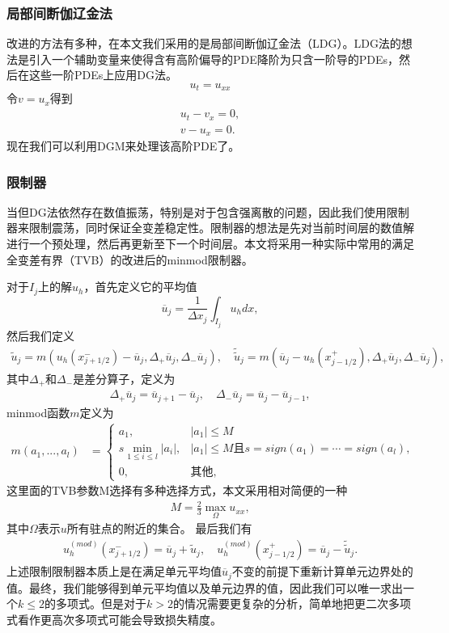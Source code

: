\subsubsection{局部间断伽辽金法}
改进的方法有多种，在本文我们采用的是局部间断伽辽金法（LDG）。LDG法的想法是引入一个辅助变量来使得含有高阶偏导的PDE降阶为只含一阶导的PDEs，然后在这些一阶PDEs上应用DG法。
\begin{equation}
    u_t = u_{xx}
\end{equation}
令$v = u_x$得到
\begin{align}
    u_t - v_x = 0, \\
    v - u_x = 0.
\end{align}
现在我们可以利用DGM来处理该高阶PDE了。
\subsubsection{限制器}
当但DG法依然存在数值振荡，特别是对于包含强离散的问题，因此我们使用限制器来限制震荡，同时保证全变差稳定性。限制器的想法是先对当前时间层的数值解进行一个预处理，然后再更新至下一个时间层。本文将采用一种实际中常用的满足全变差有界（TVB）的改进后的minmod限制器\cite{cockburn1989tvb2}。

对于$I_j$上的解$u_h$，首先定义它的平均值
$$
    \overline{u}_j = \frac{1}{\Delta x_j}\int_{I_j}u_h dx,
$$
然后我们定义
\begin{align}
    \tilde{u}_j = m(u_h(x^-_{j+1/2})-\overline{u}_j, \Delta_+\overline{u}_j, \Delta_-\overline{u}_j), \quad \tilde{\tilde{u}}_j = m(\overline{u}_j-u_h(x^+_{j-1/2}), \Delta_+\overline{u}_j, \Delta_-\overline{u}_j),
\end{align}
其中$\Delta_+$和$\Delta_-$是差分算子，定义为
\begin{align}
    \Delta_+\overline{u}_j = \overline{u}_{j+1}-\overline{u}_{j}, \quad \Delta_-\overline{u}_j = \overline{u}_{j}-\overline{u}_{j-1},
\end{align}
minmod函数$m$定义为
\begin{align}
    m(a_1, ..., a_l) & =
    \begin{cases}
        a_1,                         & |a_1| \leq M                                              \\
        s \min_{1\leq i\leq l}|a_i|, & |a_1| \leq M \text{且}s = sign(a_1) = \cdots = sign(a_l), \\
        0 ,                          & \text{其他},
    \end{cases}
\end{align}
这里面的TVB参数M选择有多种选择方式，本文采用相对简便的一种\cite{cockburn1989tvb3}
\begin{align}
    M = \frac{2}{3}\max_{\Omega}u_{xx},
\end{align}
其中$\Omega$表示$u$所有驻点的附近的集合。
最后我们有
\begin{align}
    u^{(mod)}_h(x^-_{j+1/2}) = \overline{u}_j + \tilde{u}_j, \quad u^{(mod)}_h(x^+_{j-1/2}) = \overline{u}_j - \tilde{\tilde{u}}_j.
\end{align}
上述限制限制器本质上是在满足单元平均值$\overline{u}_j$不变的前提下重新计算单元边界处的值。最终，我们能够得到单元平均值以及单元边界的值，因此我们可以唯一求出一个$k\leq 2$的多项式。但是对于$k> 2$的情况需要更复杂的分析，简单地把更二次多项式看作更高次多项式可能会导致损失精度。

